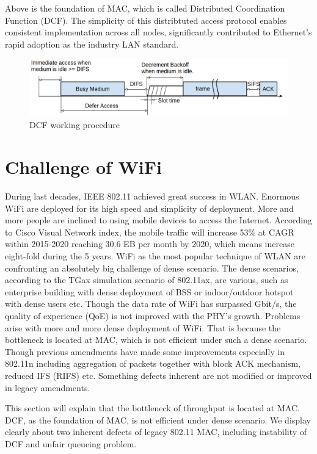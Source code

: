 Above is the foundation of MAC, which is called Distributed Coordination Function (DCF).
The simplicity of this distribtuted access protocol enables consistent implementation across all nodes, significantly contributed to Ethernet's rapid adoption as the industry LAN standard.


\begin{figure}[!t]
\includegraphics[scale=0.41]{./figure/chp1/dcf.png}
\caption{DCF working procedure}
\label{fig_dcf}
\end{figure}

\section{Challenge of WiFi}
During last decades, IEEE 802.11 achieved great success in WLAN. Enormous WiFi are deployed for its high speed and simplicity of deployment. 
More and more people are inclined to using mobile devices to access the Internet.
According to Cisco Visual Network index\cite{cisco2016}, the mobile traffic will increase 53\% at CAGR within 2015-2020 reaching 30.6 EB per month by 2020, which means increase eight-fold during the 5 years.
WiFi as the most popular technique of WLAN are confronting an absolutely big challenge of dense scenario.
The dense scenarios, according to the TGax simulation scenario  \cite{802.11ax_simu} of 802.11ax, are various, such as enterprise building with dense deployment of BSS or indoor/outdoor hotspot with dense users etc.
Though the data rate of WiFi has surpassed Gbit/s, the quality of experience (QoE) \cite{qoe} is not improved with the PHY's growth.
Problems arise with more and more dense deployment of WiFi.
That is because the bottleneck is located at MAC, which is not efficient under such a dense scenario.
Though previous amendments have made some improvements especially in 802.11n including aggregation of packets together with block ACK mechanism, reduced IFS (RIFS) etc.
Something defects inherent are not modified or improved in legacy amendments.

This section will explain that the bottleneck of throughput is located at MAC. 
DCF, as the foundation of MAC, is not efficient under dense scenario.
We display clearly about two inherent defects of legacy 802.11 MAC, including instability of DCF and unfair queueing problem.

